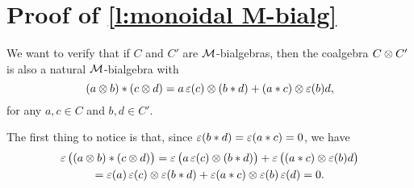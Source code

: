 
\newcommand{\sk}[1]{\\ #1\ &}
\newcommand{\bdast}[2]{\bd #1 \ast #2 + (-1)^{#1+1} #1 \ast \bd #2 + \aug(#1) #2 + (-1)^{#1+1} #1 \aug(#2)}

\section{Proof of \cref{l:monoidal M-bialg}}\label{s:appendix}

We want to verify that if $C$ and $C'$ are $\mathcal{M}$-bialgebras, then the coalgebra $C \otimes C'$ is also a natural $\mathcal{M}$-bialgebra with
\begin{equation}\label{eq:monoidal appendix}
	(a \otimes b) \ast (c \otimes d) =
	a \operatorname{\varepsilon}(c) \otimes (b \ast d) + (a \ast c) \otimes \operatorname{\varepsilon}(b) d,
\end{equation}
for any $a,c \in C$ and $b,d \in C'$.

The first thing to notice is that, since $\operatorname{\varepsilon}(b \ast d) = \operatorname{\varepsilon}(a \ast c) = 0$, we have
\begin{multline*}
	\operatorname{\varepsilon}\big((a \otimes b) \ast (c \otimes d)\big) =
	\operatorname{\varepsilon}\big(a \operatorname{\varepsilon}(c) \otimes (b \ast d)\big) + \operatorname{\varepsilon}\big((a \ast c) \otimes \operatorname{\varepsilon}(b) d\big) \\ =
	\operatorname{\varepsilon}(a) \operatorname{\varepsilon}(c) \otimes \operatorname{\varepsilon}(b \ast d) + \operatorname{\varepsilon}(a \ast c) \otimes \operatorname{\varepsilon}(b) \operatorname{\varepsilon}(d) = 0.
\end{multline*}

